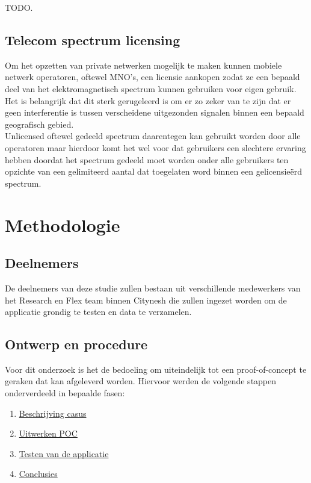 TODO.

\subsection{Telecom spectrum licensing}

Om het opzetten van private netwerken mogelijk te maken kunnen mobiele netwerk operatoren, oftewel MNO's, een licensie aankopen zodat ze een bepaald deel van het elektromagnetisch spectrum kunnen gebruiken voor eigen gebruik. Het is belangrijk dat dit sterk gerugeleerd is om er zo zeker van te zijn dat er geen interferentie is tussen verscheidene uitgezonden signalen binnen een bepaald geografisch gebied.\autocite{Trick2022} \\

Unlicensed oftewel gedeeld spectrum daarentegen kan gebruikt worden door alle operatoren maar hierdoor komt het wel voor dat gebruikers een slechtere ervaring hebben doordat het spectrum gedeeld moet worden onder alle gebruikers ten opzichte van een gelimiteerd aantal dat toegelaten word binnen een gelicensieërd spectrum.\autocite{Trick2022}


\section{Methodologie}%
\label{sec:methodologie}

\subsection{Deelnemers}

De deelnemers van deze studie zullen bestaan uit verschillende medewerkers van het Research en Flex team binnen Citynesh die zullen ingezet worden om de applicatie grondig te testen en data te verzamelen.

\subsection{Ontwerp en procedure}

Voor dit onderzoek is het de bedoeling om uiteindelijk tot een proof-of-concept te geraken dat kan afgeleverd worden. Hiervoor werden de volgende stappen onderverdeeld in bepaalde fasen:

\begin{enumerate}
    \item \hyperref[subsub:beschrijving]{Beschrijving casus}
    \item \hyperref[subsub:uitwerking]{Uitwerken POC}
    \item \hyperref[subsub:testfase]{Testen van de applicatie}
    \item \hyperref[subsub:conclusies]{Conclusies}
\end{enumerate}

